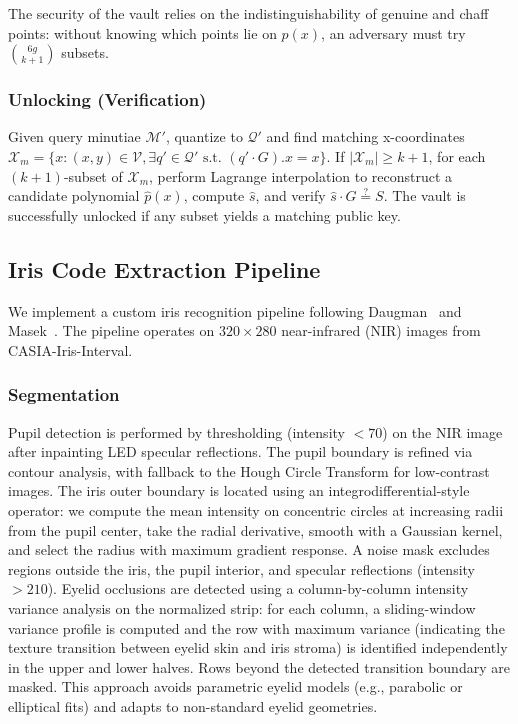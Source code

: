 \documentclass[conference]{IEEEtran}
\begin{document}
The security of the vault relies on the indistinguishability of genuine and chaff points: without knowing which points lie on $p(x)$, an adversary must try $\binom{6g}{k+1}$ subsets.

\subsubsection{Unlocking (Verification)}
Given query minutiae $\mathcal{M}'$, quantize to $\mathcal{Q}'$ and find matching x-coordinates $\mathcal{X}_m = \{x : (x,y) \in \mathcal{V}, \exists q' \in \mathcal{Q}' \text{ s.t. } (q' \cdot G).x = x\}$. If $|\mathcal{X}_m| \geq k+1$, for each $(k{+}1)$-subset of $\mathcal{X}_m$, perform Lagrange interpolation to reconstruct a candidate polynomial $\hat{p}(x)$, compute $\hat{s}$, and verify $\hat{s} \cdot G \stackrel{?}{=} S$. The vault is successfully unlocked if any subset yields a matching public key.

\subsection{Iris Code Extraction Pipeline}
\label{sec:iris_extraction}

We implement a custom iris recognition pipeline following Daugman~\cite{daugman2004how} and Masek~\cite{masek2003thesis}. The pipeline operates on $320 \times 280$ near-infrared (NIR) images from CASIA-Iris-Interval.

\subsubsection{Segmentation}
Pupil detection is performed by thresholding (intensity $< 70$) on the NIR image after inpainting LED specular reflections. The pupil boundary is refined via contour analysis, with fallback to the Hough Circle Transform for low-contrast images. The iris outer boundary is located using an integrodifferential-style operator: we compute the mean intensity on concentric circles at increasing radii from the pupil center, take the radial derivative, smooth with a Gaussian kernel, and select the radius with maximum gradient response. A noise mask excludes regions outside the iris, the pupil interior, and specular reflections (intensity $> 210$). Eyelid occlusions are detected using a column-by-column intensity variance analysis on the normalized strip: for each column, a sliding-window variance profile is computed and the row with maximum variance (indicating the texture transition between eyelid skin and iris stroma) is identified independently in the upper and lower halves. Rows beyond the detected transition boundary are masked. This approach avoids parametric eyelid models (e.g., parabolic or elliptical fits) and adapts to non-standard eyelid geometries.
\end{document}

